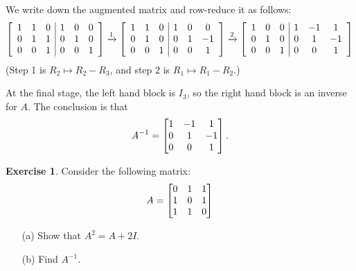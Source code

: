 \documentclass[a4paper]{book}
\theoremstyle{definition}
\newtheorem{exercise}[theorem]{Exercise}
\renewenvironment{solution}{\SolutionInline}{\endSolutionInline}
\begin{document}
\begin{solution}
 We write down the augmented matrix and row-reduce it as follows:
 {\newcommand{\h}{\tfrac{1}{2}}\small 
  \[
   \left[\begin{array}{ccc|ccc}
     1& 1& 0 &  1& 0& 0 \\
     0& 1& 1 &  0& 1& 0 \\
     0& 0& 1 &  0& 0& 1
   \end{array}\right] \xrightarrow{1}
   \left[\begin{array}{ccc|ccc}
     1& 1& 0 &  1& 0& 0 \\
     0& 1& 0 &  0& 1&-1 \\
     0& 0& 1 &  0& 0& 1
   \end{array}\right] \xrightarrow{2}
   \left[\begin{array}{ccc|ccc}
     1& 0& 0 &  1&-1& 1 \\
     0& 1& 0 &  0& 1&-1 \\
     0& 0& 1 &  0& 0& 1
   \end{array}\right]
  \]}
 (Step 1 is $R_2\mapsto R_2-R_3$, and step 2 is $R_1\mapsto R_1-R_2$.)

 At the final stage, the left hand block is $I_3$, so the right hand
 block is an inverse for $A$.  The conclusion is that 
 \[ A^{-1} = \begin{bmatrix} 1&-1&1 \\ 0&1&-1 \\ 0&0&1 \end{bmatrix}. \]
\end{solution}
\begin{exercise}
 Consider the following matrix:
 \[ A = \begin{bmatrix}
          0 & 1 & 1   \\
          1 & 0 & 1   \\
          1 & 1 & 0
        \end{bmatrix}
 \]
 \begin{itemize}
  \item[(a)] Show that $A^2=A+2I$.
  \item[(b)] Find $A^{-1}$.
 \end{itemize}
\end{exercise}
\end{document}
